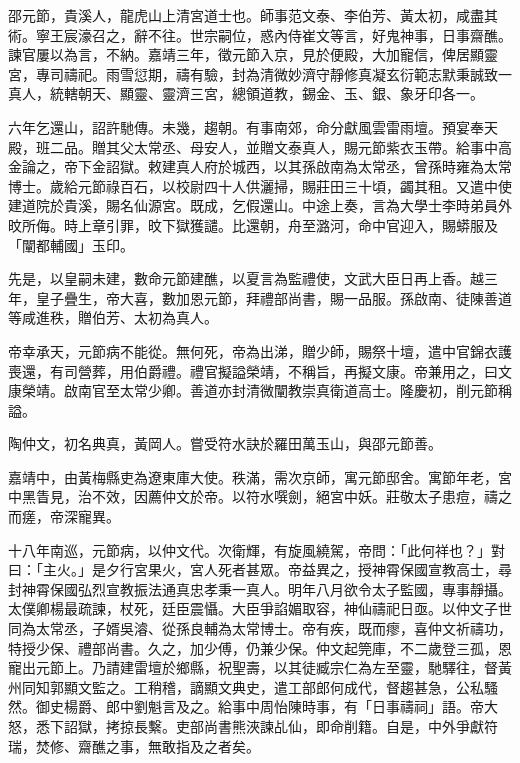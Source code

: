 \begin{pinyinscope}
邵元節，貴溪人，龍虎山上清宮道士也。師事范文泰、李伯芳、黃太初，咸盡其術。寧王宸濠召之，辭不往。世宗嗣位，惑內侍崔文等言，好鬼神事，日事齋醮。諫官屢以為言，不納。嘉靖三年，徵元節入京，見於便殿，大加寵信，俾居顯靈宮，專司禱祀。雨雪愆期，禱有驗，封為清微妙濟守靜修真凝玄衍範志默秉誠致一真人，統轄朝天、顯靈、靈濟三宮，總領道教，錫金、玉、銀、象牙印各一。

六年乞還山，詔許馳傳。未幾，趨朝。有事南郊，命分獻風雲雷雨壇。預宴奉天殿，班二品。贈其父太常丞、母安人，並贈文泰真人，賜元節紫衣玉帶。給事中高金論之，帝下金詔獄。敕建真人府於城西，以其孫啟南為太常丞，曾孫時雍為太常博士。歲給元節祿百石，以校尉四十人供灑掃，賜莊田三十頃，蠲其租。又遣中使建道院於貴溪，賜名仙源宮。既成，乞假還山。中途上奏，言為大學士李時弟員外旼所侮。時上章引罪，旼下獄獲譴。比還朝，舟至潞河，命中官迎入，賜蟒服及「闡都輔國」玉印。

先是，以皇嗣未建，數命元節建醮，以夏言為監禮使，文武大臣日再上香。越三年，皇子疊生，帝大喜，數加恩元節，拜禮部尚書，賜一品服。孫啟南、徒陳善道等咸進秩，贈伯芳、太初為真人。

帝幸承天，元節病不能從。無何死，帝為出涕，贈少師，賜祭十壇，遣中官錦衣護喪還，有司營葬，用伯爵禮。禮官擬謚榮靖，不稱旨，再擬文康。帝兼用之，曰文康榮靖。啟南官至太常少卿。善道亦封清微闡教崇真衛道高士。隆慶初，削元節稱謚。

陶仲文，初名典真，黃岡人。嘗受符水訣於羅田萬玉山，與邵元節善。

嘉靖中，由黃梅縣吏為遼東庫大使。秩滿，需次京師，寓元節邸舍。寓節年老，宮中黑眚見，治不效，因薦仲文於帝。以符水噀劍，絕宮中妖。莊敬太子患痘，禱之而瘥，帝深寵異。

十八年南巡，元節病，以仲文代。次衛輝，有旋風繞駕，帝問：「此何祥也？」對曰：「主火。」是夕行宮果火，宮人死者甚眾。帝益異之，授神霄保國宣教高士，尋封神霄保國弘烈宣教振法通真忠孝秉一真人。明年八月欲令太子監國，專事靜攝。太僕卿楊最疏諫，杖死，廷臣震懾。大臣爭諂媚取容，神仙禱祀日亟。以仲文子世同為太常丞，子婿吳濬、從孫良輔為太常博士。帝有疾，既而瘳，喜仲文祈禱功，特授少保、禮部尚書。久之，加少傅，仍兼少保。仲文起筦庫，不二歲登三孤，恩寵出元節上。乃請建雷壇於鄉縣，祝聖壽，以其徒臧宗仁為左至靈，馳驛往，督黃州同知郭顯文監之。工稍稽，謫顯文典史，遣工部郎何成代，督趨甚急，公私騷然。御史楊爵、郎中劉魁言及之。給事中周怡陳時事，有「日事禱祠」語。帝大怒，悉下詔獄，拷掠長繫。吏部尚書熊浹諫乩仙，即命削籍。自是，中外爭獻符瑞，焚修、齋醮之事，無敢指及之者矣。


\end{pinyinscope}
